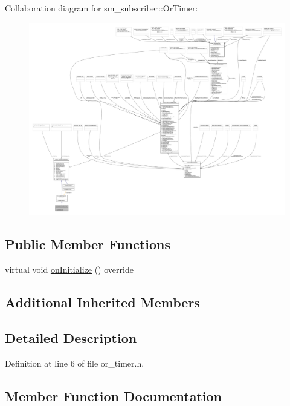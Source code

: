 Collaboration diagram for sm\+\_\+subscriber\+:\+:Or\+Timer\+:
\nopagebreak
\begin{figure}[H]
\begin{center}
\leavevmode
\includegraphics[width=350pt]{classsm__subscriber_1_1OrTimer__coll__graph}
\end{center}
\end{figure}
\subsection*{Public Member Functions}
\begin{DoxyCompactItemize}
\item 
virtual void \hyperlink{classsm__subscriber_1_1OrTimer_a7f3c5ea8a06724c6d1404c4d3c93fd82}{on\+Initialize} () override
\end{DoxyCompactItemize}
\subsection*{Additional Inherited Members}


\subsection{Detailed Description}


Definition at line 6 of file or\+\_\+timer.\+h.



\subsection{Member Function Documentation}
\mbox{\label{classsm__subscriber_1_1OrTimer_a7f3c5ea8a06724c6d1404c4d3c93fd82}} 
